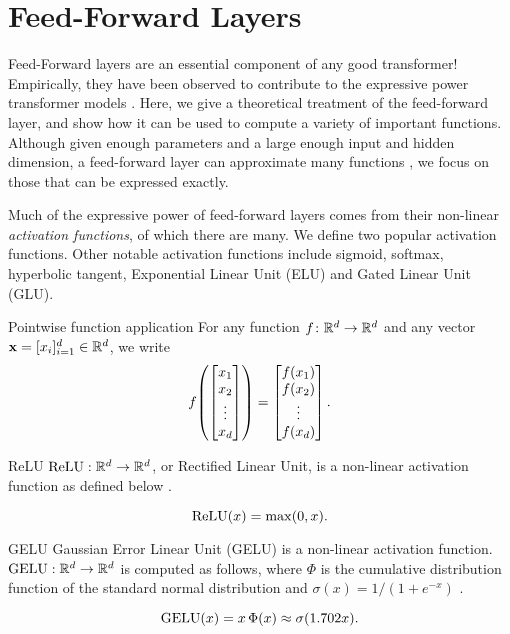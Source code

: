 %
\chapter{Feed-Forward Layers}
%


Feed-Forward layers are an essential component of any good transformer!
Empirically, they have been observed to contribute to the expressive power transformer models \cite{geva-etal-2021-transformer}.
Here, we give a theoretical treatment of the feed-forward layer, and show how it can be used to compute a variety of important functions.
Although given enough parameters and a large enough input and hidden dimension, a feed-forward layer can approximate many functions \cite{hornik1989multilayer}, we focus on those that can be expressed exactly.


Much of the expressive power of feed-forward layers comes from their non-linear \emph{activation functions}, of which there are many. We define two popular activation functions. Other notable activation functions include sigmoid, softmax, hyperbolic tangent, Exponential Linear Unit (ELU) and Gated Linear Unit (GLU).

\begin{definition}{Pointwise function application}{}
  For any function $f \colon \mathbb{R}^d \to \mathbb{R}^d$ and any vector $\mathbf{x} = [x_i]_{i=1}^d \in \mathbb{R}^d$, we write
  \begin{equation*}
    f\mleft(\begin{bmatrix} x_1 \\ x_2 \\ \vdots \\ x_d \end{bmatrix}\mright) =  \begin{bmatrix} f(x_1) \\ f(x_2) \\ \vdots \\ f(x_d) \end{bmatrix}.
  \end{equation*}
\end{definition}

\begin{definition}{ReLU}{}
    $\text{ReLU} : \mathbb{R}^d\to \mathbb{R}^d$, or Rectified Linear Unit, is a non-linear activation function as defined below \cite{Fukushima1975}.

    \[\text{ReLU}(x) = \max(0,x).\]
\end{definition}

\begin{definition}{GELU}{}
    Gaussian Error Linear Unit (GELU) is a non-linear activation function. $\text{GELU} : \mathbb{R}^d\to \mathbb{R}^d$ is computed as follows, where $\Phi$ is the cumulative distribution function of the standard normal distribution and $\sigma(x) = 1/(1+e^{-x})$ \cite{hendrycks2023}.

    \[\text{GELU}(x) = x\,\Phi(x) \approx \sigma(1.702 x).\]
\end{definition}


